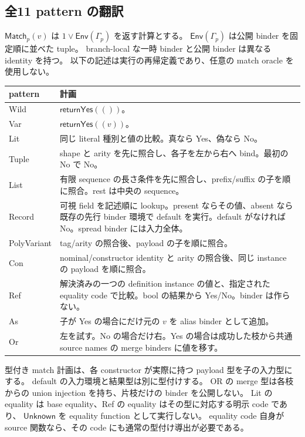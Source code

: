 \documentclass[11pt,a4paper]{article}
\newcommand{\Ret}{\mathsf{return}}
\begin{document}
\subsection{全11 pattern の翻訳}

\(\mathsf{Match}_{p}(v)\) は \(1\vee\mathsf{Env}(\Gamma_p)\) を返す計算とする。
\(\mathsf{Env}(\Gamma_p)\) は公開 binder を固定順に並べた tuple。
branch-local な一時 binder と公開 binder は異なる identity を持つ。
以下の記述は実行の再帰定義であり、任意の match oracle を使用しない。

\begin{longtable}{p{}p{}}
\toprule
pattern & 計画 \\
\midrule\endhead
Wild & \(\Ret\mathsf{Yes}(())\)。\\
Var & \(\Ret\mathsf{Yes}((v))\)。\\
Lit & 同じ literal 種別と値の比較。真なら Yes、偽なら No。\\
Tuple & shape と arity を先に照合し、各子を左から右へ bind。最初の No で No。\\
List & 有限 sequence の長さ条件を先に照合し、prefix/suffix の子を順に照合。rest は中央の sequence。\\
Record & 可視 field を記述順に lookup。present ならその値、absent なら既存の先行 binder 環境で default を実行。default がなければ No。spread binder には入力全体。\\
PolyVariant & tag/arity の照合後、payload の子を順に照合。\\
Con & nominal/constructor identity と arity の照合後、同じ instance の payload を順に照合。\\
Ref & 解決済みの一つの definition instance の値と、指定された equality code で比較。bool の結果から Yes/No。binder は作らない。\\
As & 子が Yes の場合にだけ元の \(v\) を alias binder として追加。\\
Or & 左を試す。No の場合だけ右。Yes の場合は成功した枝から共通 source names の merge binders に値を移す。\\
\bottomrule
\end{longtable}

型付き match 計画は、各 constructor が実際に持つ payload 型を子の入力型にする。
default の入力環境と結果型は別に型付けする。
OR の merge 型は各枝からの union injection を持ち、片枝だけの binder を公開しない。
Lit の equality は base equality、Ref の equality はその型に対応する明示 code であり、
\(\mathsf{Unknown}\) を equality function として実行しない。
equality code 自身が source 関数なら、その code にも通常の型付け導出が必要である。
\end{document}
